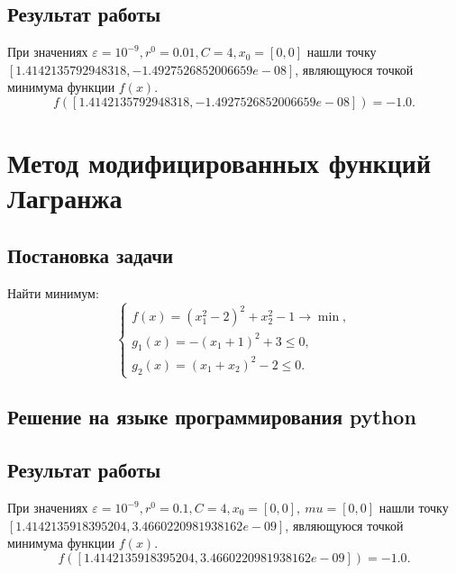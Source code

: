 \documentclass[12pt,a4paper,oneside]{extarticle}
\begin{document}
    \subsection{Результат работы}
        При значениях $\varepsilon=10^{-9}, r^0=0.01, C=4, x_0 = [0,0]$ 
    нашли точку $[1.4142135792948318, -1.4927526852006659e-08]$, являющуюся точкой минимума функции $f(x)$. 
    $$f([1.4142135792948318, -1.4927526852006659e-08]) = -1.0.$$

\section{Метод модифицированных функций Лагранжа}
    \subsection{Постановка задачи}
        Найти минимум:
        \begin{equation*}
            \begin{cases}
                f(x) = (x_1^2-2)^2 + x_2^2 - 1 \rightarrow \min, \\
                g_1(x) = -(x_1 + 1)^2 + 3 \le 0, \\
                g_2(x) = (x_1 + x_2)^2 - 2 \le 0.
            \end{cases}
        \end{equation*}
        

    \subsection{Решение на языке программирования python}
        

    \subsection{Результат работы}
        При значениях $\varepsilon=10^{-9}, r^0=0.1, C=4, x_0 = [0,0], \    mu = [0,0]$ 
    нашли точку $[1.4142135918395204, 3.4660220981938162e-09]$, являющуюся точкой минимума функции $f(x)$. 
    $$f([1.4142135918395204, 3.4660220981938162e-09]) = -1.0.$$    
\end{document}
